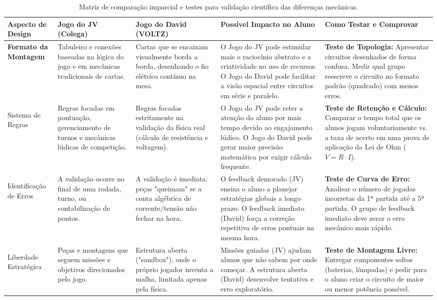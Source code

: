 \documentclass[12pt,a4paper,landscape]{article}
\begin{document}
\begin{table}[htbp]
\centering
\renewcommand{\arraystretch}{1.4}
\begin{tabularx}{\textwidth}{@{} >{\bfseries}p{2.8cm} X X X X @{}}
\toprule
Aspecto de Design & \textbf{Jogo do JV (Colega)} & \textbf{Jogo do David (VOLTZ)} & \textbf{Possível Impacto no Aluno} & \textbf{Como Testar e Comprovar} \\
\midrule

Formato da Montagem & Tabuleiro e conexões baseadas na lógica do jogo e em mecânicas tradicionais de cartas. & Cartas que se encaixam visualmente borda a borda, desenhando o fio elétrico contínuo na mesa. & O Jogo do JV pode estimular mais o raciocínio abstrato e a criatividade no uso de recursos. O Jogo do David pode facilitar a visão espacial entre circuitos em série e paralelo. & \textbf{Teste de Topologia:} Apresentar circuitos desenhados de forma confusa. Medir qual grupo reescreve o circuito no formato padrão (quadrado) com menos erros. \\
\addlinespace

Sistema de Regras & Regras focadas em pontuação, gerenciamento de turnos e mecânicas lúdicas de competição. & Regras focadas estritamente na validação da física real (cálculo de resistência e voltagem). & O Jogo do JV pode reter a atenção do aluno por mais tempo devido ao engajamento lúdico. O Jogo do David pode gerar maior precisão matemática por exigir cálculo frequente. & \textbf{Teste de Retenção e Cálculo:} Comparar o tempo total que os alunos jogam voluntariamente vs. a taxa de acerto em uma prova de aplicação da Lei de Ohm ($V=R \cdot I$). \\
\addlinespace

Identificação de Erros & A validação ocorre no final de uma rodada, turno, ou contabilização de pontos. & A validação é imediata: peças "queimam" se a conta algébrica de corrente/tensão não fechar na hora. & O feedback demorado (JV) ensina o aluno a planejar estratégias globais a longo prazo. O feedback imediato (David) força a correção repetitiva de erros pontuais na mesma hora. & \textbf{Teste de Curva de Erro:} Analisar o número de jogadas incorretas da 1ª partida até a 5ª partida. O grupo de feedback imediato deve zerar o erro mecânico mais rápido. \\
\addlinespace

Liberdade Estratégica & Peças e montagens que seguem missões e objetivos direcionados pelo jogo. & Estrutura aberta ("sandbox"), onde o próprio jogador inventa a malha, limitada apenas pela física. & Missões guiadas (JV) ajudam alunos que não sabem por onde começar. A estrutura aberta (David) desenvolve tentativa e erro exploratório. & \textbf{Teste de Montagem Livre:} Entregar componentes soltos (baterias, lâmpadas) e pedir para o aluno criar o circuito de maior ou menor potência possível. \\

\bottomrule
\end{tabularx}
\caption{Matriz de comparação imparcial e testes para validação científica das diferenças mecânicas.}
\label{tab:comparacao}
\end{table}
\end{document}
